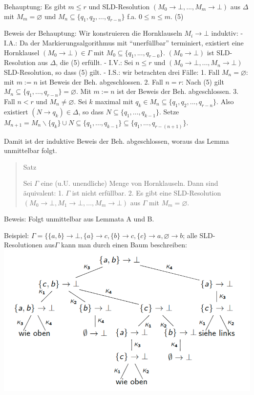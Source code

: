 \documentclass[a4paper]{article}
\begin{document}
\begin{multicols}{3}
  Behauptung: Es gibt $m\leq r$ und SLD-Resolution
  $(M_0\rightarrow\bot,...,M_m\rightarrow\bot)$ aus $\Delta$ mit
  $M_m=\varnothing$ und $M_n\subseteq\{q_1,q_2,... ,q_{r-n}\}$ f.a.
  $0\leq n\leq m$. (5)

  Beweis der Behauptung: Wir konstruieren die Hornklauseln
  $M_i\rightarrow\bot$ induktiv: - I.A.: Da der Markierungsalgorithmus mit
  ``unerfüllbar'' terminiert, existiert eine Hornklausel
  $(M_0\rightarrow\bot)\in\Gamma$ mit $M_0\subseteq\{q_1,... ,q_{r- 0}\}$.
  $(M_0\rightarrow\bot)$ ist SLD-Resolution aus $\Delta$, die (5) erfüllt.
  - I.V.: Sei $n\leq r$ und $(M_0\rightarrow\bot,... ,M_n\rightarrow\bot)$
  SLD-Resolution, so dass (5) gilt. - I.S.: wir betrachten drei Fälle: 1.
  Fall $M_n=\varnothing$: mit $m:=n$ ist Beweis der Beh. abgeschlossen. 2.
  Fall $n=r$: Nach (5) gilt $M_n\subseteq\{q_1,...,q_{r-n}\}=\varnothing$.
  Mit $m:=n$ ist der Beweis der Beh. abgeschlossen. 3. Fall $n<r$ und
  $M_n \not=\varnothing$. Sei $k$ maximal mit
  $q_k\in M_n\subseteq\{q_1,q_2,... ,q_{r-n}\}$. Also existiert
  $(N\rightarrow q_k)\in\Delta$, so dass $N\subseteq\{q_1,... ,q_{k-1}\}$.
  Setze
  $M_{n+1}=M_n\backslash\{q_k\}\cup N\subseteq\{q_1,... ,q_{k-1}\}\subseteq\{q_1,...,q_{r-(n+1)}\}$.

  Damit ist der induktive Beweis der Beh. abgeschlossen, woraus das Lemma
  unmittelbar folgt.

  \begin{quote}
    Satz

    Sei $\Gamma$ eine (u.U. unendliche) Menge von Hornklauseln. Dann sind
    äquivalent: 1. $\Gamma$ ist nicht erfüllbar. 2. Es gibt eine
    SLD-Resolution
    $(M_0\rightarrow\bot,M_1\rightarrow\bot,... ,M_m\rightarrow\bot)$ aus
    $\Gamma$ mit $M_m=\varnothing$.
  \end{quote}

  Beweis: Folgt unmittelbar aus Lemmata A und B.

  Beispiel:
  $\Gamma=\{\{a,b\}\rightarrow\bot,\{a\}\rightarrow c, \{b\}\rightarrow c,\{c\}\rightarrow a,\varnothing\rightarrow b$;
  alle SLD-Resolutionen aus$\Gamma$ kann man durch einen Baum beschreiben:
  \includegraphics[width=\linewidth]{Assets/Logik-beispiel-11.png}


\end{multicols}
\end{document}
